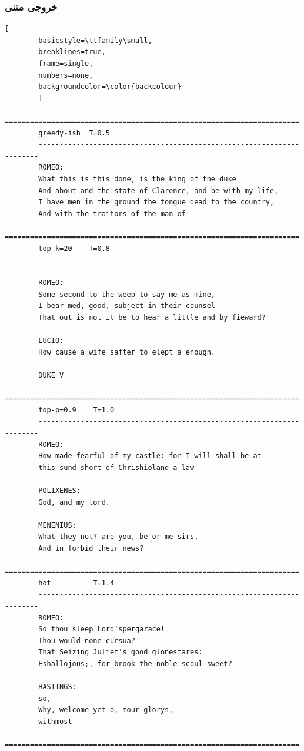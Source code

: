 \documentclass{article}
\begin{document}
\subsubsection*{خروجی متنی}
\begin{latin}
	\begin{lstlisting}[
		basicstyle=\ttfamily\small,
		breaklines=true,
		frame=single,
		numbers=none,
		backgroundcolor=\color{backcolour}
		]
		======================================================================
		greedy-ish  T=0.5
		----------------------------------------------------------------------
		ROMEO:
		What this is this done, is the king of the duke
		And about and the state of Clarence, and be with my life,
		I have men in the ground the tongue dead to the country,
		And with the traitors of the man of 
		======================================================================
		top-k=20    T=0.8
		----------------------------------------------------------------------
		ROMEO:
		Some second to the weep to say me as mine,
		I bear med, good, subject in their counsel
		That out is not it be to hear a little and by fieward?
		
		LUCIO:
		How cause a wife safter to elept a enough.
		
		DUKE V
		======================================================================
		top-p=0.9    T=1.0
		----------------------------------------------------------------------
		ROMEO:
		How made fearful of my castle: for I will shall be at
		this sund short of Chrishioland a law--
		
		POLIXENES:
		God, and my lord.
		
		MENENIUS:
		What they not? are you, be or me sirs,
		And in forbid their news?
		======================================================================
		hot          T=1.4
		----------------------------------------------------------------------
		ROMEO:
		So thou sleep Lord'spergarace!
		Thou would none cursua?
		That Seizing Juliet's good glonestares:
		Eshallojous;, for brook the noble scoul sweet?
		
		HASTINGS:
		so,
		Why, welcome yet o, mour glorys,
		withmost 
		======================================================================
	\end{lstlisting}
\end{latin}
\end{document}
